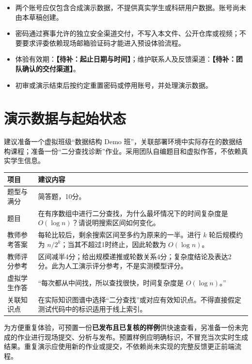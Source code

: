 \documentclass[UTF8,a4paper,zihao=-4,fontset=fandol]{ctexart}
\newcommand{\pending}[1]{\textbf{【待补：#1】}}
\begin{document}
\begin{itemize}
  \item 两个账号应仅包含合成演示数据，不提供真实学生或科研用户数据。账号尚未由本草稿创建。
  \item 密码通过赛事允许的独立安全渠道交付，不写入本文件、公开仓库或视频；不要要求评委依赖现场邮箱验证码才能进入预设体验流程。
  \item 体验有效期：\pending{起止日期与时间}；维护联系人及反馈渠道：\pending{团队确认的交付渠道}。
  \item 初审或演示结束后按约定重置密码或停用账号，并处理演示数据。
\end{itemize}

\section{演示数据与起始状态}
建议准备一个虚拟班级“数据结构 Demo 班”，关联部署环境中实际存在的数据结构课程；准备一份“二分查找诊断”作业。采用团队自编题目和虚拟作答，不依赖真实学生信息。

\noindent\begin{tabularx}{\textwidth}{@{}p{2.4cm}X@{}}
\toprule
项目 & 建议内容 \\
\midrule
题型与满分 & 简答题，10分。 \\
题目 & 在有序数组中进行二分查找，为什么最坏情况下的时间复杂度是 $O(\log n)$？请说明搜索区间如何变化。 \\
教师参考答案 & 每轮比较后，剩余搜索区间至多约为原来的一半。进行 $k$ 轮后规模约为 $n/2^k$；当其不超过1时终止，因此轮数为 $O(\log n)$。 \\
教师评分参考 & 区间减半4分；给出规模递推或轮数关系4分；复杂度结论及表达2分。此为人工演示评分参考，不是实测模型评分。 \\
虚拟学生作答 & “每次都从中间找，所以查找很快，时间复杂度是 $O(\log n)$。” \\
关联知识点 & 在实际知识图谱中选择“二分查找”或对应有效知识点。不得直接假定测试代码中的标识适用于线上索引。 \\
\bottomrule
\end{tabularx}

为方便重复体验，可预置一份\textbf{已发布且已复核的样例}供快速查看，另准备一份未完成的作业进行现场提交、分析与发布。预置样例应明确标识，不冒充当次实时生成结果。重复演示应使用新的作业或提交，不依赖尚未实现的完整反馈更正前端流程。
\end{document}
